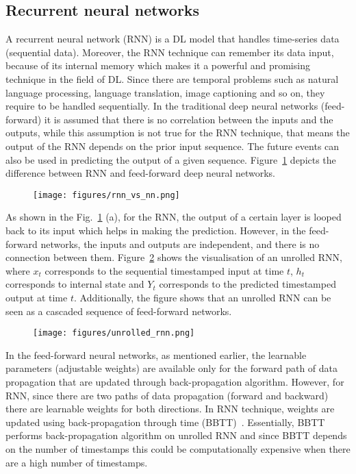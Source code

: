 \subsection{Recurrent neural networks}
A recurrent neural network (RNN) is a DL model that handles time-series data (sequential data).
Moreover, the RNN technique can remember its data input, because of its internal memory which makes it a powerful and promising technique in the field of DL.
Since there are temporal problems such as natural language processing, language translation, image captioning and so on, they require to be handled sequentially.
In the traditional deep neural networks (feed-forward) it is assumed that there is no correlation between the inputs and the outputs, while this assumption is not true for the RNN technique, that means the output of the RNN depends on the prior input sequence.
The future events can also be used in predicting the output of a given sequence.
Figure~\ref{rnn_vs_nn} depicts the difference between RNN and feed-forward deep neural networks.
\begin{figure}
	\begin{center}
		\texttt{[image: figures/rnn\_vs\_nn.png]}
	\end{center}
	\label{rnn_vs_nn}
\end{figure}
As shown in the Fig.~\ref{rnn_vs_nn} (a), for the RNN, the output of a certain layer is looped back to its input which helps in making the prediction.
However, in the feed-forward networks, the inputs and outputs are independent, and there is no connection between them.
Figure~\ref{unrolled_rnn} shows the visualisation of an unrolled RNN, where \(x_{t}\) corresponds to the sequential timestamped input at time \(t\), \(h_{t}\) corresponds to internal state  and \(Y_{t}\) corresponds to the predicted timestamped output at time \(t\).
Additionally, the figure shows that an unrolled RNN can be seen as a cascaded sequence of feed-forward networks.
\begin{figure}
	\begin{center}
		\texttt{[image: figures/unrolled\_rnn.png]}
	\end{center}
	\label{unrolled_rnn}
\end{figure}
In the feed-forward neural networks, as mentioned earlier, the learnable parameters (adjustable weights) are available only for the forward path of data propagation that are updated through back-propagation algorithm.
However, for RNN, since there are two paths of data propagation (forward and backward) there are learnable weights for both directions.
In RNN technique, weights are updated using back-propagation through time (BBTT)~\cite{Werbos1990}.
Essentially, BBTT performs back-propagation algorithm on unrolled RNN and since BBTT depends on the number of timestamps this could be computationally expensive when there are a high number of timestamps.

